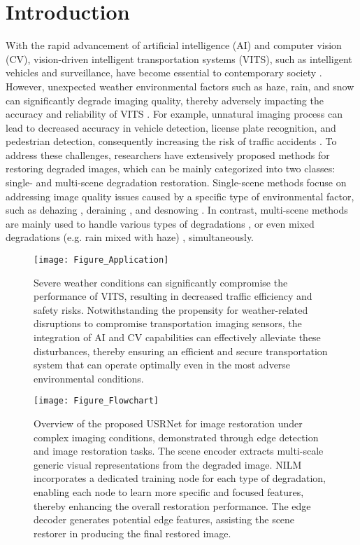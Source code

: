 \documentclass[final,12pt]{elsarticle}
\begin{document}
\section{Introduction}\label{sec:introd}
%
   With the rapid advancement of artificial intelligence (AI) and computer vision (CV), vision-driven intelligent transportation systems (VITS), such as intelligent vehicles and surveillance, have become essential to contemporary society \citep{wan2022edge}. However, unexpected weather environmental factors such as haze, rain, and snow can significantly degrade imaging quality, thereby adversely impacting the accuracy and reliability of VITS \citep{liu2023aioenet}. For example, unnatural imaging process can lead to decreased accuracy in vehicle detection, license plate recognition, and pedestrian detection, consequently increasing the risk of traffic accidents \citep{husain2020vehicle}. To address these challenges, researchers have extensively proposed methods for restoring degraded images, which can be mainly categorized into two classes: single- and multi-scene degradation restoration. Single-scene methods focuse on addressing image quality issues caused by a specific type of environmental factor, such as dehazing \citep{he2010single,chen2024dea}, deraining \citep{fu2017clearing}, and desnowing \citep{liu2018desnownet}. In contrast, multi-scene methods are mainly used to handle various types of degradations \citep{liu2023aioenet,zhu2023learning,liu2024residual}, or even mixed degradations (e.g. rain mixed with haze) \citep{xu2024mvksr,guo2024onerestore}, simultaneously.
%
    \begin{figure}[t]
        \centering
        \setlength{\abovecaptionskip}{0.cm}
        \texttt{[image: Figure\_Application]}
        \caption{Severe weather conditions can significantly compromise the performance of VITS, resulting in decreased traffic efficiency and safety risks. Notwithstanding the propensity for weather-related disruptions to compromise transportation imaging sensors, the integration of AI and CV capabilities can effectively alleviate these disturbances, thereby ensuring an efficient and secure transportation system that can operate optimally even in the most adverse environmental conditions.}
        \label{Figure_Application}
    \end{figure}

    \begin{figure*}[t]
        \centering
        \setlength{\abovecaptionskip}{0.cm}
        \texttt{[image: Figure\_Flowchart]}
        \caption{Overview of the proposed USRNet for image restoration under complex imaging conditions, demonstrated through edge detection and image restoration tasks. The scene encoder extracts multi-scale generic visual representations from the degraded image. NILM incorporates a dedicated training node for each type of degradation, enabling each node to learn more specific and focused features, thereby enhancing the overall restoration performance. The edge decoder generates potential edge features, assisting the scene restorer in producing the final restored image.}
        \label{Figure_Flowchart}
    \end{figure*}
\end{document}
